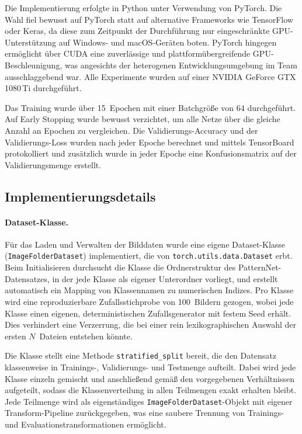 Die Implementierung erfolgte in Python unter Verwendung von PyTorch.
Die Wahl fiel bewusst auf PyTorch statt auf alternative Frameworks wie TensorFlow oder Keras, da diese zum Zeitpunkt der Durchführung nur eingeschränkte GPU-Unterstützung auf Windows- und macOS-Geräten boten.
PyTorch hingegen ermöglicht über CUDA eine zuverlässige und plattformübergreifende GPU-Beschleunigung, was angesichts der heterogenen Entwicklungsumgebung im Team ausschlaggebend war.
Alle Experimente wurden auf einer NVIDIA GeForce GTX 1080\,Ti durchgeführt.

Das Training wurde über 15~Epochen mit einer Batchgröße von 64 durchgeführt.
Auf Early Stopping wurde bewusst verzichtet, um alle Netze über die gleiche Anzahl an Epochen zu vergleichen.
Die Validierungs-Accuracy und der Validierungs-Loss wurden nach jeder Epoche berechnet und mittels TensorBoard protokolliert und zusätzlich wurde in jeder Epoche eine Konfusionsmatrix auf der Validierungsmenge erstellt.

\subsection{Implementierungsdetails}
\label{subsec:implementierung}

\paragraph{Dataset-Klasse.}
Für das Laden und Verwalten der Bilddaten wurde eine eigene Dataset-Klasse (\texttt{ImageFolderDataset}) implementiert, die von \texttt{torch.utils.data.Dataset} erbt.
Beim Initialisieren durchsucht die Klasse die Ordnerstruktur des PatternNet-Datensatzes, in der jede Klasse als eigener Unterordner vorliegt, und erstellt automatisch ein Mapping von Klassennamen zu numerischen Indizes.
Pro Klasse wird eine reproduzierbare Zufallsstichprobe von 100~Bildern gezogen, wobei jede Klasse einen eigenen, deterministischen Zufallsgenerator mit festem Seed erhält.
Dies verhindert eine Verzerrung, die bei einer rein lexikographischen Auswahl der ersten $N$~Dateien entstehen könnte.
 
Die Klasse stellt eine Methode \texttt{stratified\_split} bereit, die den Datensatz klassenweise in Trainings-, Validierungs- und Testmenge aufteilt.
Dabei wird jede Klasse einzeln gemischt und anschließend gemäß den vorgegebenen Verhältnissen aufgeteilt, sodass die Klassenverteilung in allen Teilmengen exakt erhalten bleibt.
Jede Teilmenge wird als eigenständiges \texttt{ImageFolderDataset}-Objekt mit eigener Transform-Pipeline zurückgegeben, was eine saubere Trennung von Trainings- und Evaluationstransformationen ermöglicht.
 
